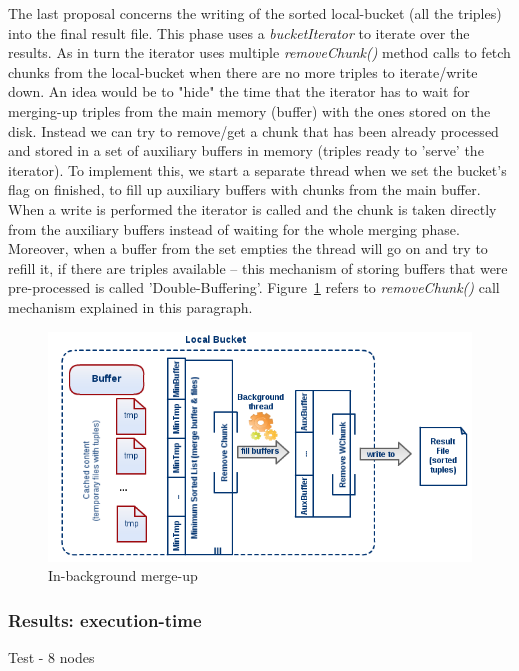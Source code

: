 The last proposal concerns the writing of the sorted local-bucket (all the triples) into the final result file. This phase uses a \textit{bucketIterator} to iterate over the results. As in turn the iterator uses multiple \textit{removeChunk()} method calls to fetch chunks from the local-bucket when there are no more triples to iterate/write down. An idea would be to "hide" the time that the iterator has to wait for merging-up triples from the main memory (buffer) with the ones stored on the disk. Instead we can try to remove/get a chunk that has been already processed and stored in a set of auxiliary buffers in memory (triples ready to 'serve' the iterator). To implement this, we start a separate thread when we set the bucket's flag on finished, to fill up auxiliary buffers with chunks from the main buffer. When a write is performed the iterator is called and the chunk is taken directly from the auxiliary buffers instead of waiting for the whole merging phase. Moreover, when a buffer from the set empties the thread will go on and try to refill it, if there are triples available -- this mechanism of storing buffers that were pre-processed is called 'Double-Buffering'. Figure~\ref{fig:diag5} refers to \textit{removeChunk()} call mechanism explained in this paragraph. 

\begin{figure}
\centering
\includegraphics[scale=0.6]{diag5}
\caption{In-background merge-up}
\label{fig:diag5}
\end{figure}

% 
\subsubsection{Results: execution-time}

Test - 8 nodes
\newline \newline
\renewcommand{\arraystretch}{1.2}
{\footnotesize\tt

}

